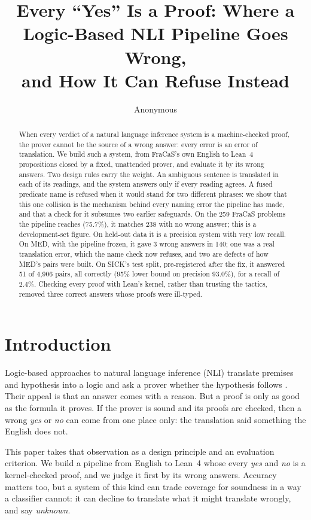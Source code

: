 \documentclass[11pt]{article}
\title{Every ``Yes'' Is a Proof: Where a Logic-Based NLI Pipeline Goes Wrong,\\and How It Can Refuse Instead}
\author{Anonymous}
\newcommand{\yes}{\textit{yes}}
\newcommand{\no}{\textit{no}}
\newcommand{\unk}{\textit{unknown}}
\begin{document}
\maketitle

\begin{abstract}
When every verdict of a natural language inference system is a
machine-checked proof, the prover cannot be the source of a wrong
answer: every error is an error of translation. We build such a
system, from FraCaS's own English to Lean~4 propositions closed by a
fixed, unattended prover, and evaluate it by its wrong answers. Two
design rules carry the weight. An ambiguous sentence is translated in
each of its readings, and the system answers only if every reading
agrees. A fused predicate name is refused when it would stand for two
different phrases: we show that this one collision is the mechanism
behind every naming error the pipeline has made, and that a check for
it subsumes two earlier safeguards. On the 259 FraCaS problems the
pipeline reaches (75.7\%), it matches 238 with no wrong answer;
this is a development-set figure. On held-out data it is a precision
system with very low recall. On MED, with the pipeline frozen, it gave
3 wrong answers in 140; one was a real translation error, which the
name check now refuses, and two are defects of how MED's pairs were
built. On SICK's test split, pre-registered after the fix, it
answered 51 of 4,906 pairs, all correctly (95\% lower bound on
precision 93.0\%), for a recall of 2.4\%. Checking every proof with
Lean's kernel, rather than trusting the tactics, removed three correct
answers whose proofs were ill-typed.
\end{abstract}

\section{Introduction}

Logic-based approaches to natural language inference (NLI) translate
premises and hypothesis into a logic and ask a prover whether the
hypothesis follows \citep{mineshima-etal-2015-higher,abzianidze-2015-tableau,bernardy-chatzikyriakidis-2017-type}.
Their appeal is that an answer comes with a reason. But a proof is
only as good as the formula it proves. If the prover is sound and its
proofs are checked, then a wrong \yes{} or \no{} can come from one
place only: the translation said something the English does not.

This paper takes that observation as a design principle and an
evaluation criterion. We build a pipeline from English to Lean~4
\citep{demoura-ullrich-2021-lean4} whose every \yes{} and \no{} is a
kernel-checked proof, and we judge it first by its wrong answers.
Accuracy matters too, but a system of this kind can trade coverage for
soundness in a way a classifier cannot: it can decline to translate
what it might translate wrongly, and say \unk{}.
\end{document}

